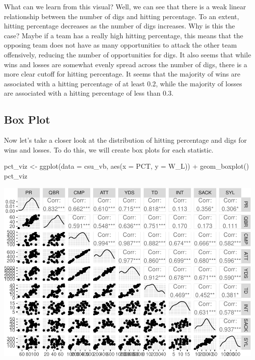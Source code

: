 \documentclass[
  11pt,
]{book}
\newenvironment{Shaded}{\begin{snugshade}}{\end{snugshade}}
\newcommand{\AttributeTok}[1]{\textcolor[rgb]{0.77,0.63,0.00}{#1}}
\newcommand{\FunctionTok}[1]{\textcolor[rgb]{0.00,0.00,0.00}{#1}}
\newcommand{\NormalTok}[1]{#1}
\newcommand{\OtherTok}[1]{\textcolor[rgb]{0.56,0.35,0.01}{#1}}
\newcommand{\SpecialCharTok}[1]{\textcolor[rgb]{0.00,0.00,0.00}{#1}}
\theoremstyle{definition}
\theoremstyle{definition}
\theoremstyle{definition}
\theoremstyle{definition}
\theoremstyle{remark}
\begin{document}
What can we learn from this visual? Well, we can see that there is a weak linear relationship between the number of digs and hitting percentage. To an extent, hitting percentage decreases as the number of digs increases. Why is this the case? Maybe if a team has a really high hitting percentage, this means that the opposing team does not have as many opportunities to attack the other team offensively, reducing the number of opportunities for digs. It also seems that while wins and losses are somewhat evenly spread across the number of digs, there is a more clear cutoff for hitting percentage. It seems that the majority of wins are associated with a hitting percentage of at least 0.2, while the majority of losses are associated with a hitting percentage of less than 0.3.

\hypertarget{box-plot}{%
\subsection{Box Plot}\label{box-plot}}

Now let's take a closer look at the distribution of hitting percentage and digs for wins and losses. To do this, we will create box plots for each statistic.

\begin{Shaded}
\begin{Highlighting}[]
\NormalTok{pct\_viz }\OtherTok{\textless{}{-}} \FunctionTok{ggplot}\NormalTok{(}\AttributeTok{data =}\NormalTok{ csu\_vb, }\FunctionTok{aes}\NormalTok{(}\AttributeTok{x =}\NormalTok{ PCT, }\AttributeTok{y =}\NormalTok{ W\_L)) }\SpecialCharTok{+} \FunctionTok{geom\_boxplot}\NormalTok{()}
\NormalTok{pct\_viz}
\end{Highlighting}
\end{Shaded}

\includegraphics{series_files/figure-latex/unnamed-chunk-21-1.pdf}
\end{document}
